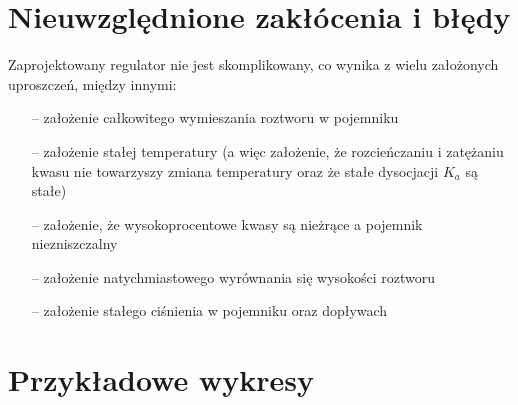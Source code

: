 \documentclass[polish,polish,a4paper,12pt]{article}
\begin{document}
	\section{Nieuwzględnione zakłócenia i błędy}
	
	Zaprojektowany regulator nie jest skomplikowany, co wynika z wielu założonych uproszczeń, między innymi:
	
	\begin{enumerate}
		\item [--] założenie całkowitego wymieszania roztworu w pojemniku
		\item [--] założenie stałej temperatury (a więc założenie, że rozcieńczaniu i zatężaniu kwasu nie towarzyszy zmiana temperatury oraz że stałe dysocjacji $K_a$ są stałe)
		\item [--] założenie, że wysokoprocentowe kwasy są nieżrące a pojemnik niezniszczalny
		\item [--] założenie natychmiastowego wyrównania się wysokości roztworu
		\item [--] założenie stałego ciśnienia w pojemniku oraz dopływach
	\end{enumerate}
	
	\section{Przykładowe wykresy}
	
\end{document}
